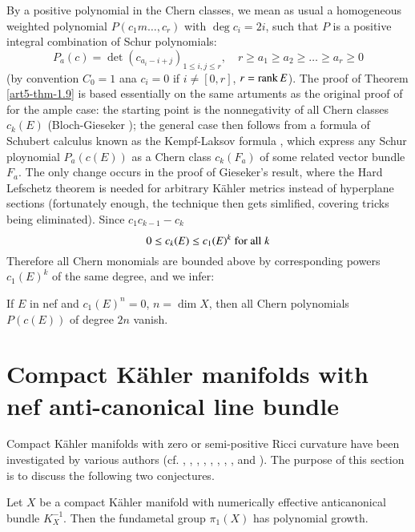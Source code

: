 By a positive polynomial in the Chern classes, we mean as usual a homogeneous weighted polynomial $P(c_{1}m \ldots, c_{r})$ with $\deg c_{i}= 2i$, such that $P$ is a positive integral combination of Schur polynomials:
$$
P_{a}(c)= \det (c_{a_{i}-i+j})_{1\leq i, j\leq r}, \quad r \geq a_{1} \geq a_{2} \geq \ldots \geq a_{r} \geq 0
$$
(by convention $C_{0}=1$ ana $c_{i} = 0$ if $i \neq [0,r]$, $r= \operatorname{rank} E$). The proof of Theorem \ref{art5-thm-1.9} is based essentially on the same artuments as the original proof of \cite{art5-keyFL83} for the ample case: the starting point is the nonnegativity of all Chern classes $c_{k}(E)$ (Bloch-Gieseker \cite{art5-keyBG71}); the general case then
follows from a formula of Schubert calculus known as the Kempf-Laksov formula \cite{art5-keyKL74}, which express any Schur ploynomial $P_{a}(c(E))$ as a Chern class $c_{k}(F_{a})$ of some related vector bundle $F_{a}$. The only change occurs in the proof of Gieseker's result, where the Hard Lefschetz theorem is needed for arbitrary K\"ahler metrics instead of hyperplane sections (fortunately enough, the technique then gets simlified, covering tricks being eliminated). Since $c_{1}c_{k-1}-c_{k}$
$$
0 \leq c_{k}(E) \leq c_{1} (E)^{k} \;\text{\rm for all}\; k
$$
Therefore all Chern monomials are bounded above by corresponding powers $c_{1}(E)^{k}$ of the same degree, and we infer:

\begin{coro}\label{art5-coro-1.10}
If $E$ in nef and $c_{1}(E)^{n} =0$, $n= \dim X$, then all Chern polynomials $P(c(E))$ of degree $2n$ vanish.
\end{coro}

\section{Compact K\"ahler manifolds with nef anti-canonical line bundle}\label{art5-sec-2}
 Compact K\"ahler manifolds with zero or semi-positive Ricci curvature have been investigated by various authors (cf. \cite{art5-keyCa57}, \cite{art5-keyKo61}, \cite{art5-keyLi67}, \cite{art5-key71}, \cite{art5-key72}, \cite{art5-key} \cite{art5-keyBo74a}, \cite{art5-keyb}, \cite{art5-keyBe83}, \cite{art5-keyKo81} and \cite{art5-keykr86}). The purpose of this section is to discuss the following two conjectures.

\begin{conjecture}\label{art5-conje-2.1}
Let $X$ be a compact K\"ahler manifold with numerically effective anticanonical bundle $K_{X}^{-1}$. Then the fundametal group $\pi_{1}(X)$ has polynomial growth.
\end{conjecture}

